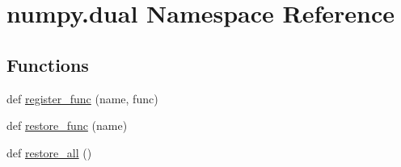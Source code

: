 \hypertarget{namespacenumpy_1_1dual}{}\section{numpy.\+dual Namespace Reference}
\label{namespacenumpy_1_1dual}
\subsection*{Functions}
\begin{DoxyCompactItemize}
\item 
def \hyperlink{namespacenumpy_1_1dual_aaeb5847bc14cfd25af96706900b19acd}{register\+\_\+func} (name, func)
\item 
def \hyperlink{namespacenumpy_1_1dual_af15ff0af9fb593e2020b9aa3bbe9fe4f}{restore\+\_\+func} (name)
\item 
def \hyperlink{namespacenumpy_1_1dual_a72f240d5e1340a3f0cb6faddf559e5f7}{restore\+\_\+all} ()
\end{DoxyCompactItemize}
